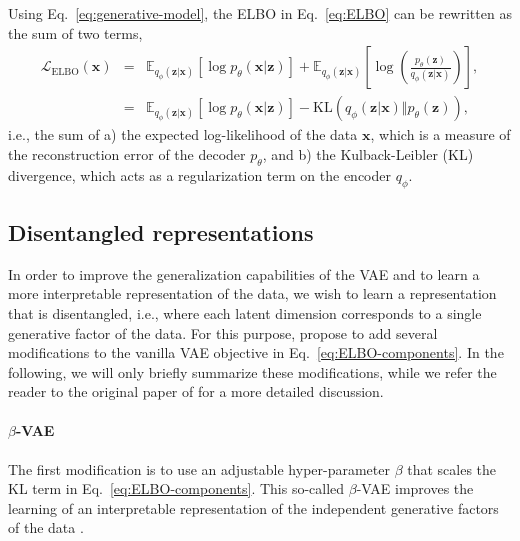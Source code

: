 \documentclass[english,a4paper,10pt]{scrartcl}
\begin{document}
Using Eq.~\eqref{eq:generative-model}, the ELBO in Eq.~\eqref{eq:ELBO} can be rewritten as the sum of two terms,
\begin{subequations}
    \begin{eqnarray}
        \mathcal{L}_{\mathrm{ELBO}}(\mathbf{x}) & = & \mathbb{E}_{q_{\phi}(\mathbf{z}|\mathbf{x})}\left[\log p_{\theta}(\mathbf{x}|\mathbf{z})\right] + \mathbb{E}_{q_{\phi}(\mathbf{z}|\mathbf{x})}\left[\log\left(\frac{p_{\theta}(\mathbf{z})}{q_{\phi}(\mathbf{z}|\mathbf{x})}\right)\right],\\
        & = & \mathbb{E}_{q_{\phi}(\mathbf{z}|\mathbf{x})}\left[\log p_{\theta}(\mathbf{x}|\mathbf{z})\right] - \mathrm{KL}\left(q_{\phi}(\mathbf{z}|\mathbf{x})\Vert p_{\theta}(\mathbf{z})\right),\label{eq:ELBO-components}
    \end{eqnarray}
\end{subequations}
i.e., the sum of a) the expected log-likelihood of the data $\mathbf{x}$, which is a measure of the reconstruction error of the decoder $p_\theta$, and b) the Kulback-Leibler (KL) divergence, which acts as a regularization term on the encoder $q_\phi$.

\subsection{Disentangled representations}

In order to improve the generalization capabilities of the VAE and to learn a more interpretable representation of the data, we wish to learn a representation that is disentangled, i.e., where each latent dimension corresponds to a single generative factor of the data. For this purpose, \cite{Groth.Chavez.2023} propose to add several modifications to the vanilla VAE objective in Eq.~\eqref{eq:ELBO-components}. In the following, we will only briefly summarize these modifications, while we refer the reader to the original paper of \cite{Groth.Chavez.2023} for a more detailed discussion.

\paragraph{$\beta$-VAE}
The first modification is to use an adjustable hyper-parameter $\beta$ that scales the KL term in Eq.~\eqref{eq:ELBO-components}. This so-called $\beta$-VAE improves the learning of an interpretable representation of the independent generative factors of the data \citep{Higgins.Matthey.ea.2017}.
\end{document}

